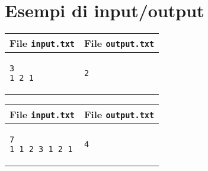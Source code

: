 \documentclass[a4paper,11pt]{article}
\begin{document}
\section*{Esempi di input/output}

  
    \noindent
    \begin{tabular}{p{11cm}|p{5cm}}
    \toprule
    \textbf{File \texttt{input.txt}}
    & \textbf{File \texttt{output.txt}}
    \\
    \midrule
    \scriptsize
    \begin{verbatim}
3 
1 2 1
\end{verbatim}
    &
    \scriptsize
    \begin{verbatim}
2
\end{verbatim}
    \\
    \bottomrule
    \end{tabular}
  
    \noindent
    \begin{tabular}{p{11cm}|p{5cm}}
    \toprule
    \textbf{File \texttt{input.txt}}
    & \textbf{File \texttt{output.txt}}
    \\
    \midrule
    \scriptsize
    \begin{verbatim}
7
1 1 2 3 1 2 1
\end{verbatim}
    &
    \scriptsize
    \begin{verbatim}
4
\end{verbatim}
    \\
    \bottomrule
    \end{tabular}
  
\end{document}
